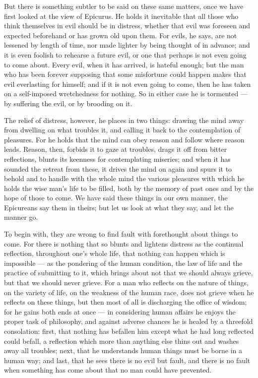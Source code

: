  But there is something subtler to be said on these same matters, once we have first looked at the view of Epicurus. He holds it inevitable that all those who think themselves in evil should be in distress, whether that evil was foreseen and expected beforehand or has grown old upon them. For evils, he says, are not lessened by length of time, nor made lighter by being thought of in advance; and it is even foolish to rehearse a future evil, or one that perhaps is not even going to come about. Every evil, when it has arrived, is hateful enough; but the man who has been forever supposing that some misfortune could happen makes that evil everlasting for himself; and if it is not even going to come, then he has taken on a self-imposed wretchedness for nothing. So in either case he is tormented — by suffering the evil, or by brooding on it.

 The relief of distress, however, he places in two things: drawing the mind away from dwelling on what troubles it, and calling it back to the contemplation of pleasures. For he holds that the mind can obey reason and follow where reason leads. Reason, then, forbids it to gaze at troubles, drags it off from bitter reflections, blunts its keenness for contemplating miseries; and when it has sounded the retreat from these, it drives the mind on again and spurs it to behold and to handle with the whole mind the various pleasures with which he holds the wise man's life to be filled, both by the memory of past ones and by the hope of those to come. We have said these things in our own manner, the Epicureans say them in theirs; but let us look at what they say, and let the manner go.

 To begin with, they are wrong to find fault with forethought about things to come. For there is nothing that so blunts and lightens distress as the continual reflection, throughout one's whole life, that nothing can happen which is impossible — as the pondering of the human condition, the law of life and the practice of submitting to it, which brings about not that we should always grieve, but that we should never grieve. For a man who reflects on the nature of things, on the variety of life, on the weakness of the human race, does not grieve when he reflects on these things, but then most of all is discharging the office of wisdom; for he gains both ends at once — in considering human affairs he enjoys the proper task of philosophy, and against adverse chances he is healed by a threefold consolation: first, that nothing has befallen him except what he had long reflected could befall, a reflection which more than anything else thins out and washes away all troubles; next, that he understands human things must be borne in a human way; and last, that he sees there is no evil but fault, and there is no fault when something has come about that no man could have prevented.

